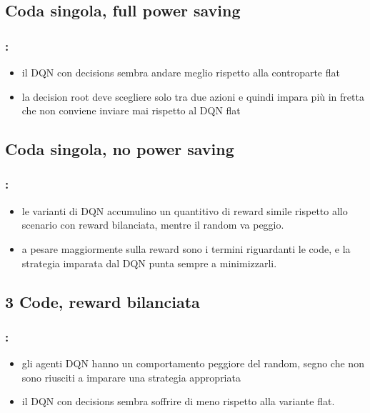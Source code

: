 \documentclass[compress]{beamer}
\begin{document}
\subsection{Coda singola, full power saving}
\begin{frame}
    \frametitle{\secname: \subsecname}
    \begin{figure}
        
        \label{fig:allPowerSaving_allAgents_defaultConfig}
    \end{figure}    
    \begin{itemize}
        \item il DQN con decisions sembra 
        andare meglio rispetto alla controparte flat
        \item la decision root deve scegliere solo tra due azioni e quindi
        impara più in fretta che non conviene inviare mai rispetto al DQN flat
    \end{itemize}
\end{frame}

\subsection{Coda singola, no power saving}
\begin{frame}
    \frametitle{\secname: \subsecname}
    \begin{figure}
        \centering
        
        \label{fig:noPowerSaving_allAgents_defaultConfig}
    \end{figure}
        \begin{itemize}
        \item le varianti di DQN accumulino un quantitivo di reward simile rispetto allo
        scenario con reward bilanciata, mentre il random va peggio.
        \item a pesare
        maggiormente sulla reward sono i termini riguardanti le code, e la
        strategia imparata dal DQN punta sempre a minimizzarli.
    \end{itemize}
\end{frame}
\subsection{3 Code, reward bilanciata}
\begin{frame}
    \frametitle{\secname: \subsecname}
    \begin{figure}
        
        \label{fig:balanced_allAgents_5queues_300s}
    \end{figure}
        \begin{itemize}
        \item gli agenti 
        DQN hanno un comportamento peggiore del random, segno che non sono riusciti a imparare una 
        strategia appropriata
        \item il DQN con decisions sembra soffrire di meno rispetto
        alla variante flat.
    \end{itemize}
\end{frame}
\end{document}
